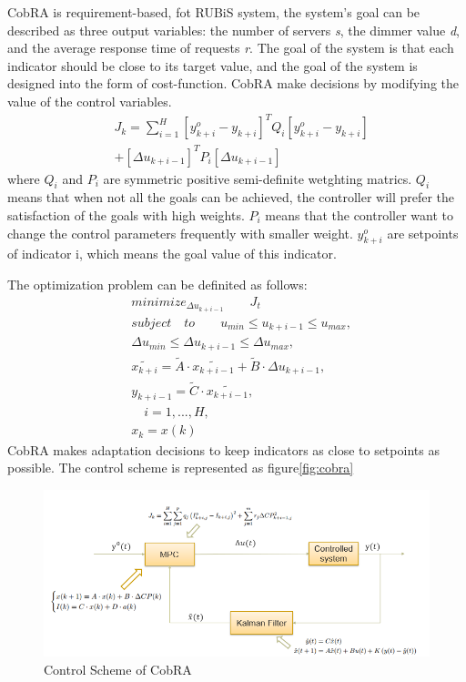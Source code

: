 \documentclass[sigconf]{acmart}
\begin{document}
CobRA is requirement-based, fot RUBiS system, the system's goal can be described as three output variables: the number of servers \textit{s}, the dimmer value \textit{d}, and the average response time of requests \textit{r}.
The goal of the system is that each indicator should be close to its target value, and the goal of the system is designed into the form of cost-function. CobRA make decisions by modifying the value of the control variables.
\begin{equation}
\begin{aligned}
&J_{k}=\sum_{i=1}^H [y_{k+i}^o -y_{k+i}]^TQ_{i}[y_{k+i}^o -y_{k+i}] \\
&+[\Delta u_{k+i-1}]^T P_{i}[\Delta u_{k+i-1}]
\end{aligned}
\end{equation}
where $Q_{i}$ and $P_{i}$ are symmetric positive semi-definite wetghting matrics. $Q_i$ means that when not all the goals can be achieved, the controller will prefer the satisfaction of the goals with high weights. $P_i$ means that the controller want to change the control parameters frequently with smaller weight. $y_{k+i}^o$ are setpoints of indicator i, which means the goal value of this indicator. 

The optimization problem can be definited as follows:
\begin{equation}
\begin{aligned}
&minimize_{\Delta u_{k+i-1}}\qquad J_t \\
&subject\quad to \qquad u_{min}\leq u_{k+i-1}\leq u_{max},\\
&{\Delta u_{min}}\leq{ \Delta u_{k+i-1}}\leq {\Delta u_{max}},\\
&\tilde{x_{k+i}}=\tilde{A}\cdot \tilde{x_{k+i-1}}+\tilde{B}\cdot \Delta u_{k+i-1}, \\
&y_{k+i-1}=\tilde{C}\cdot \tilde{x_{k+i-1}},\\
&\quad i=1,...,H,\\
&x_{k}=x(k)
\end{aligned}
\end{equation}
CobRA makes adaptation decisions to keep indicators as close to setpoints as possible. The control scheme is represented as figure\ref{fig:cobra}
\begin{figure}[h]
	\centering
	\includegraphics[width=\linewidth]{cobra}
	\caption{Control Scheme of CobRA}
\end{figure}
\end{document}
